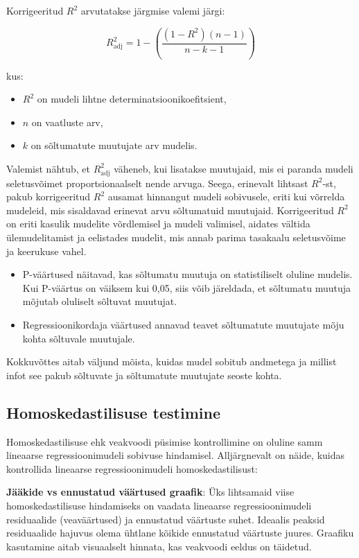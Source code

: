 \documentclass[
]{book}
\providecommand{\tightlist}{%
  \setlength{\itemsep}{0pt}\setlength{\parskip}{0pt}}
\begin{document}
Korrigeeritud \(R^2\) arvutatakse järgmise valemi järgi:

\[ R^2_{\text{adj}} = 1 - \left( \frac{(1 - R^2)(n - 1)}{n - k - 1} \right) \]

kus:

\begin{itemize}
\tightlist
\item
  \(R^2\) on mudeli lihtne determinatsioonikoefitsient,
\item
  \(n\) on vaatluste arv,
\item
  \(k\) on sõltumatute muutujate arv mudelis.
\end{itemize}

Valemist nähtub, et \(R^2_{\text{adj}}\) väheneb, kui lisatakse muutujaid, mis ei paranda mudeli seletusvõimet proportsionaalselt nende arvuga. Seega, erinevalt lihtsast \(R^2\)-st, pakub korrigeeritud \(R^2\) ausamat hinnangut mudeli sobivusele, eriti kui võrrelda mudeleid, mis sisaldavad erinevat arvu sõltumatuid muutujaid. Korrigeeritud \(R^2\) on eriti kasulik mudelite võrdlemisel ja mudeli valimisel, aidates vältida ülemudelitamist ja eelistades mudelit, mis annab parima tasakaalu seletusvõime ja keerukuse vahel.

\begin{itemize}
\item
  P-väärtused näitavad, kas sõltumatu muutuja on statistiliselt oluline mudelis. Kui P-väärtus on väiksem kui 0,05, siis võib järeldada, et sõltumatu muutuja mõjutab oluliselt sõltuvat muutujat.
\item
  Regressioonikordaja väärtused annavad teavet sõltumatute muutujate mõju kohta sõltuvale muutujale.
\end{itemize}

Kokkuvõttes aitab väljund mõista, kuidas mudel sobitub andmetega ja millist infot see pakub sõltuvate ja sõltumatute muutujate seoste kohta.

\subsection{Homoskedastilisuse testimine}\label{homoskedastilisuse-testimine}

Homoskedastilisuse ehk veakvoodi püsimise kontrollimine on oluline samm lineaarse regressioonimudeli sobivuse hindamisel. Alljärgnevalt on näide, kuidas kontrollida lineaarse regressioonimudeli homoskedastilisust:

\textbf{Jääkide vs ennustatud väärtused graafik}: Üks lihtsamaid viise homoskedastilisuse hindamiseks on vaadata lineaarse regressioonimudeli residuaalide (veaväärtused) ja ennustatud väärtuste suhet. Ideaalis peaksid residuaalide hajuvus olema ühtlane kõikide ennustatud väärtuste juures. Graafiku kasutamine aitab visuaalselt hinnata, kas veakvoodi eeldus on täidetud.
\end{document}
